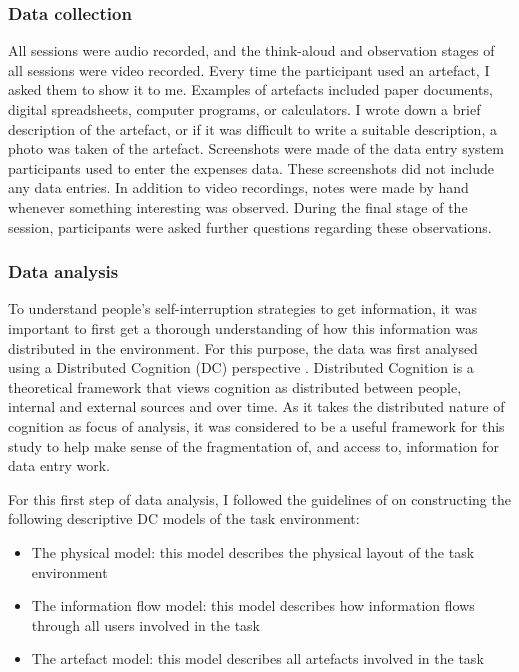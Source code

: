 \subsubsection{Data collection}
All sessions were audio recorded, and the think-aloud and observation stages of all sessions were video recorded. Every time the participant used an artefact, I asked them to show it to me. Examples of artefacts included paper documents, digital spreadsheets, computer programs, or calculators. I wrote down a brief description of the artefact, or if it was difficult to write a suitable description, a photo was taken of the artefact. Screenshots were made of the data entry system participants used to enter the expenses data. These screenshots did not include any data entries. In addition to video recordings, notes were made by hand whenever something interesting was observed. During the final stage of the session, participants were asked further questions regarding these observations.

\subsubsection{Data analysis}
To understand people’s self-interruption strategies to get information, it was important to first get a thorough understanding of how this information was distributed in the environment. For this purpose, the data was first analysed using a Distributed Cognition (DC) perspective \citep{Hutchins1995}. Distributed Cognition is a theoretical framework that views cognition as distributed between people, internal and external sources and over time. As it takes the distributed nature of cognition as focus of analysis, it was considered to be a useful framework for this study to help make sense of the fragmentation of, and access to, information for data entry work. 

For this first step of data analysis, I followed the guidelines of \citet{Furniss2006} on constructing the following descriptive DC models of the task environment:

\begin{itemize}
\item 
The physical model: this model describes the physical layout of the task environment
\item 
The information flow model: this model describes how information flows through all users involved in the task
\item 
The artefact model: this model describes all artefacts involved in the task
\end{itemize}

